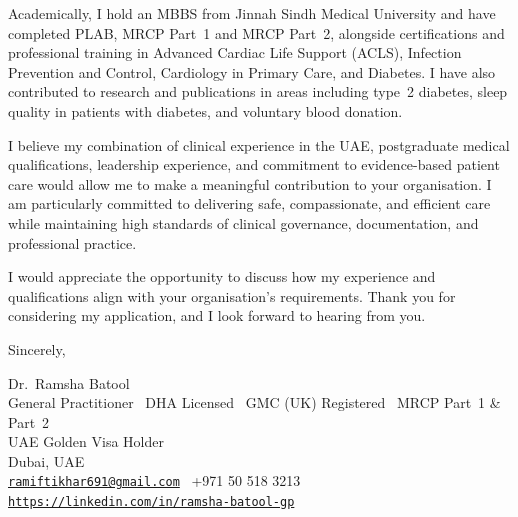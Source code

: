 \documentclass[a4paper,10pt]{article}
\begin{document}
Academically, I hold an MBBS from Jinnah Sindh Medical University and have completed PLAB, MRCP Part~1 and MRCP Part~2, alongside certifications and professional training in Advanced Cardiac Life Support (ACLS), Infection Prevention and Control, Cardiology in Primary Care, and Diabetes. I have also contributed to research and publications in areas including type~2 diabetes, sleep quality in patients with diabetes, and voluntary blood donation.

I believe my combination of clinical experience in the UAE, postgraduate medical qualifications, leadership experience, and commitment to evidence-based patient care would allow me to make a meaningful contribution to your organisation. I am particularly committed to delivering safe, compassionate, and efficient care while maintaining high standards of clinical governance, documentation, and professional practice.

I would appreciate the opportunity to discuss how my experience and qualifications align with your organisation's requirements. Thank you for considering my application, and I look forward to hearing from you.

Sincerely,

Dr.\ Ramsha Batool\\
General Practitioner \textbar\ DHA Licensed \textbar\ GMC (UK) Registered \textbar\ MRCP Part~1 \& Part~2\\
UAE Golden Visa Holder\\
Dubai, UAE\\
\texttt{\href{mailto:ramiftikhar691@gmail.com}{ramiftikhar691@gmail.com}} \textbar\ +971 50 518 3213\\
\texttt{\href{https://linkedin.com/in/ramsha-batool-gp}{https://linkedin.com/in/ramsha-batool-gp}}
\end{document}
